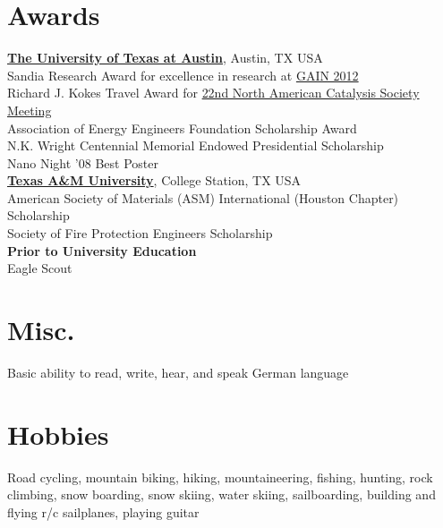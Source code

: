 \documentclass[centered]{res}
\begin{document}
\begin{resume}
\section{Awards}
% 
\href{http://www.utexas.edu/}{\textbf{The University of Texas at
    Austin}}, Austin, TX USA \\
Sandia Research Award for excellence in research at
\href{http://gain.engr.utexas.edu/}{GAIN 2012} \\
Richard J. Kokes Travel Award for
\href{http://www.22nam.org/}{22nd North American Catalysis Society
  Meeting} \\
Association of Energy Engineers Foundation Scholarship Award \\
N.K. Wright Centennial Memorial Endowed Presidential Scholarship \\
Nano Night '08 Best Poster \vspace{5pt} \\
%
\href{http://www.tamu.edu/}{\textbf{Texas A\&M University}}, College
Station, TX USA \\
American Society of Materials (ASM) International (Houston Chapter)
Scholarship \\
Society of Fire Protection Engineers Scholarship \vspace{5pt} \\
%
\textbf{Prior to University Education} \\
Eagle Scout

\section{Misc.}
%
Basic ability to read, write, hear, and speak German language

\section{Hobbies}
%
Road cycling, mountain biking, hiking, mountaineering, fishing,
hunting, rock climbing, snow boarding, snow skiing, water skiing,
sailboarding, building and flying r/c sailplanes, playing guitar

\end{resume}
\end{document}
